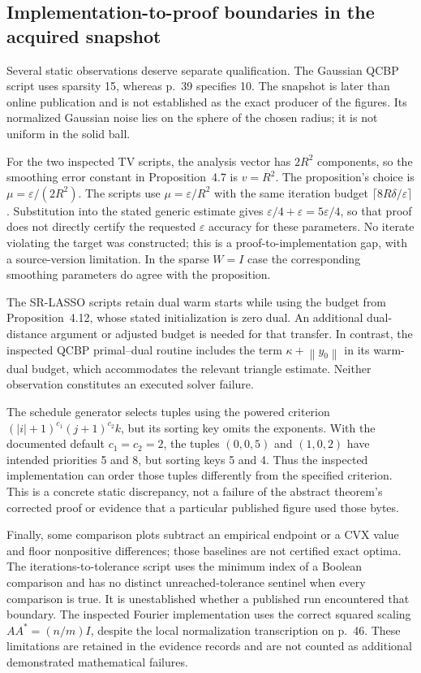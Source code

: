 \documentclass[10pt]{article}
\begin{document}
\subsection*{Implementation-to-proof boundaries in the acquired snapshot}
Several static observations deserve separate qualification. The Gaussian QCBP script uses sparsity 15, whereas p. 39 specifies 10. The snapshot is later than online publication and is not established as the exact producer of the figures. Its normalized Gaussian noise lies on the sphere of the chosen radius; it is not uniform in the solid ball.\par
For the two inspected TV scripts, the analysis vector has \(2R^2\) components, so the smoothing error constant in Proposition 4.7 is \(v=R^2\). The proposition’s choice is \(\mu=\varepsilon/(2R^2)\). The scripts use \(\mu=\varepsilon/R^2\) with the same iteration budget \(\lceil8R\delta/\varepsilon\rceil\). Substitution into the stated generic estimate gives \(\varepsilon/4+\varepsilon=5\varepsilon/4\), so that proof does not directly certify the requested \(\varepsilon\) accuracy for these parameters. No iterate violating the target was constructed; this is a proof-to-implementation gap, with a source-version limitation. In the sparse \(W=I\) case the corresponding smoothing parameters do agree with the proposition.\par
The SR-LASSO scripts retain dual warm starts while using the budget from Proposition 4.12, whose stated initialization is zero dual. An additional dual-distance argument or adjusted budget is needed for that transfer. In contrast, the inspected QCBP primal–dual routine includes the term \(\kappa+\left\lVert y_0\right\rVert\) in its warm-dual budget, which accommodates the relevant triangle estimate. Neither observation constitutes an executed solver failure.\par
The schedule generator selects tuples using the powered criterion \((|i|+1)^{c_1}(j+1)^{c_2}k\), but its sorting key omits the exponents. With the documented default \(c_1=c_2=2\), the tuples \((0,0,5)\) and \((1,0,2)\) have intended priorities 5 and 8, but sorting keys 5 and 4. Thus the inspected implementation can order those tuples differently from the specified criterion. This is a concrete static discrepancy, not a failure of the abstract theorem’s corrected proof or evidence that a particular published figure used those bytes.\par
Finally, some comparison plots subtract an empirical endpoint or a CVX value and floor nonpositive differences; those baselines are not certified exact optima. The iterations-to-tolerance script uses the minimum index of a Boolean comparison and has no distinct unreached-tolerance sentinel when every comparison is true. It is unestablished whether a published run encountered that boundary. The inspected Fourier implementation uses the correct squared scaling \(AA^*=(n/m)I\), despite the local normalization transcription on p. 46. These limitations are retained in the evidence records and are not counted as additional demonstrated mathematical failures.\par
\end{document}
